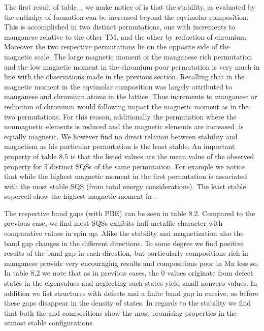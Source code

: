 The first result of table .. we make notice of is that the stability, as evaluated by the enthalpy of formation can be increased beyond the eqvimolar composition. This is accomplished in two distinct permutations, one with increments to  manganese relative to the other TM, and the other by reduction of chromium. Moreover the two respective permutations lie on the opposite side of the magnetic scale. The large magnetic moment of the manganese rich permutation and the low magnetic moment in the chromium poor permutation is very much in line with the observations made in the previous section. Recalling that in the magnetic moment in the eqvimolar composition was largely attributed to manganese and chromium atoms in the lattice. Thus increments to manganese or reduction of chromium would following impact the magnetic moment as in the two permutations. For this reason, additionally the permutation  where the nonmagnetic elements is reduced and the magnetic elements are increased ,is equally magnetic. We however find no direct relation between stability and magnetism as his particular permutation is the least stable. An important property of table 8.5 is that the listed values are the mean value of the observed property for 5 distinct SQSs of the same permutation. For example we notice that while the highest magnetic moment in the first permutation is associated with the most stable SQS (from total energy considerations). The least stable supercell show the highest magnetic moment in . 

The respective band gaps (with PBE) can be seen in table 8.2. Compared to the previous case, we find most SQSs exhibits half-metallic character with comparative values in spin up. Alike the stability and magnetization also the band gap changes in the different directions. To some degree we find positive results of the band gap in each direction, but particularly compositions rich in manganese provide very encouraging results and compositions poor in Mn less so. In table 8.2 we note that as in previous cases, the 0 values originate from defect states in the eigenvalues and neglecting such states yield small nonzero values. In addition we list structures with defects and a finite band gap in cursive, as before these gaps disappear in the density of states. In regards to the stability we find that both the  and  compositions show the most promising properties in the utmost stable configurations. 

